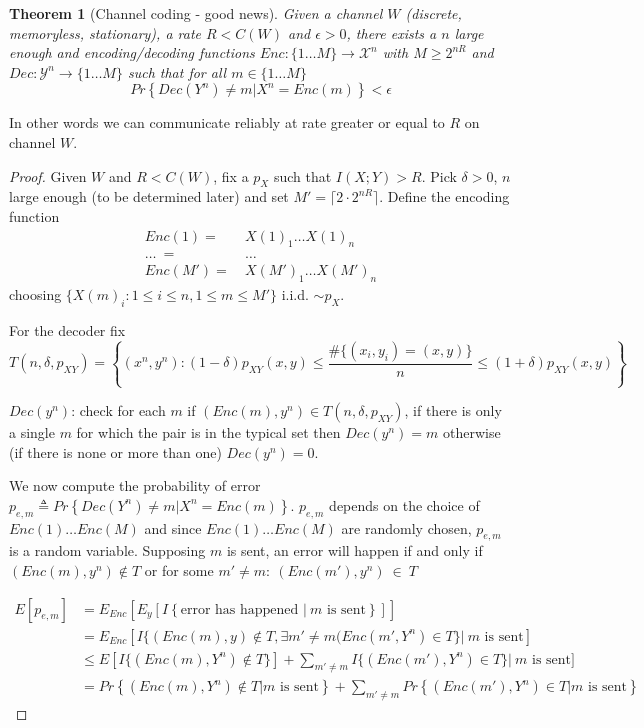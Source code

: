 \documentclass{article}
\newtheorem{theorem}{Theorem}[section]
\theoremstyle{definition} %
\renewcommand{\Pr}[1]{Pr\left\{#1\right\}}
\newcommand{\Ex}[1]{E\left[#1\right]}
\def\X{\mathcal{X}}
\def\Y{\mathcal{Y}}
\begin{document}
\begin{theorem}[Channel coding - good news]
  \label{thm:channel-coding}
  Given a channel $W$ (discrete, memoryless, stationary), a rate $R < C(W)$ and $\epsilon > 0$, there exists a $n$ large enough and encoding/decoding functions $Enc:\{1\dots M\} \to \X^n$ with $M \geq 2^{nR}$ and $Dec: \Y^n \to \{1\dots M\}$ such that for all $m\in\{1\dots M\}$
  \[
    \Pr{Dec(Y^n) \not = m | X^n = Enc(m) } < \epsilon
  \]
\end{theorem}

In other words we can communicate reliably at rate greater or equal to $R$ on channel $W$.

\begin{proof}
  Given $W$ and $R<C(W)$, fix a $p_X$ such that $I(X;Y)>R$. Pick $\delta > 0$, $n$
  large enough (to be determined later) and set $M' = \lceil 2 \cdot 2^{nR} \rceil$. Define the
  encoding function
  \begin{align*}
    Enc(1) =~&X(1)_1 \dots  X(1)_n\\
    \dots~=~&\dots\\
    Enc(M') =~&X(M')_1 \dots X(M')_n
  \end{align*}
  choosing $\{X(m)_i : 1 \leq i \leq n, 1 \leq m \leq M' \}$ i.i.d. $\sim p_X$.

  For the decoder fix
  \[
    T(n, \delta, p_{XY})= \left\{(x^n, y^n): (1-\delta)p_{XY}(x,y) \leq \frac {\# \{(x_i, y_i) = (x,y)\}} n \leq (1+\delta)p_{XY}(x,y)\right\}
  \]

  $Dec(y^n)$: check for each $m$ if $(Enc(m), y^n) \in T(n,\delta, p_{XY})$, if there is
  only a single $m$ for which the pair is in the typical set then $Dec(y^n) = m$ otherwise
  (if there is none or more than one) $Dec(y^n) = 0$.

  We now compute the probability of error $p_{e,m} \triangleq \Pr{Dec(Y^n) \not = m | X^n = Enc(m)}$. $p_{e,m}$ depends on the choice of $Enc(1) \dots Enc(M)$ and since $Enc(1) \dots Enc(M)$ are randomly chosen, $p_{e,m}$ is a random variable. Supposing $m$ is sent, an error will happen if and only if $(Enc(m), y^n) \not \in T$ or for some $m' \not = m:~(Enc(m'), y^n)~\in~T$

  \begin{align*}
    \Ex{p_{e,m}} &= E_{Enc}[ E_{y} [ I\left\{\text{error has happened $|~m$ is sent}\right\}]]\\
    &= E_{Enc}[ I\{(Enc(m),y) \not \in T, \exists m' \not=m (Enc(m', Y^n) \in T\} |~m \text{ is sent}]\\
    &\leq E[I\{(Enc(m), Y^n) \not \in T\}] + \sum_{m' \not = m} I\{(Enc(m'), Y^n) \in T\} |~m \text{ is sent}]\\
    &= \Pr{(Enc(m), Y^n) \not \in T | m \text{ is sent}} + \sum_{m'\not = m} \Pr{(Enc(m'), Y^n) \in T| m \text{ is sent}}
  \end{align*}


\end{proof}
\end{document}
